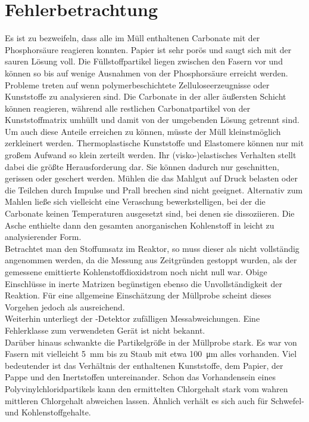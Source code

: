 \chapter{Fehlerbetrachtung}
\label{sec:fehler}

Es ist zu bezweifeln, dass alle im Müll enthaltenen Carbonate mit der Phosphorsäure reagieren konnten. Papier ist sehr porös und saugt sich mit der sauren Lösung voll. Die Füllstoffpartikel liegen zwischen den Fasern vor und können so bis auf wenige Ausnahmen von der Phosphorsäure erreicht werden. Probleme treten auf wenn polymerbeschichtete Zelluloseerzeugnisse oder Kunststoffe zu analysieren sind. Die Carbonate in der aller äußersten Schicht können reagieren, während alle restlichen Carbonatpartikel von der Kunststoffmatrix umhüllt und damit von der umgebenden Lösung getrennt sind. Um auch diese Anteile erreichen zu können, müsste der Müll kleinstmöglich zerkleinert werden. Thermoplastische Kunststoffe und Elastomere können nur mit großem Aufwand so klein zerteilt werden. Ihr (visko-)elastisches Verhalten stellt dabei die größte Herausforderung dar. Sie können dadurch nur geschnitten, gerissen oder geschert werden. Mühlen die das Mahlgut auf Druck belasten oder die Teilchen durch Impulse und Prall brechen sind nicht geeignet.
Alternativ zum Mahlen ließe sich vielleicht eine Veraschung bewerkstelligen, bei der die Carbonate keinen Temperaturen ausgesetzt sind, bei denen sie dissoziieren. Die Asche enthielte dann den gesamten anorganischen Kohlenstoff in leicht zu analysierender Form.\\
Betrachtet man den Stoffumsatz im Reaktor, so muss dieser als nicht vollständig angenommen werden, da die Messung aus Zeitgründen gestoppt wurden, als der gemessene emittierte Kohlenstoffdioxidstrom noch nicht null war. Obige Einschlüsse in inerte Matrizen begünstigen ebenso die Unvollständigkeit der Reaktion. \linebreak Für eine allgemeine Einschätzung der Müllprobe scheint dieses Vorgehen jedoch als ausreichend.\\
Weiterhin unterliegt der -Detektor zufälligen Messabweichungen. Eine Fehlerklasse zum verwendeten Gerät ist nicht bekannt.\\
Darüber hinaus schwankte die Partikelgröße in der Müllprobe stark. Es war von Fasern mit vielleicht \SI{5}{\milli\meter} bis zu Staub mit etwa \SI{100}{\micro\meter} alles vorhanden. Viel bedeutender ist das Verhältnis der enthaltenen Kunststoffe, dem Papier, der Pappe und den Inertstoffen untereinander. Schon das Vorhandensein eines Polyvinylchloridpartikels kann den ermittelten Chlorgehalt stark vom wahren mittleren Chlorgehalt abweichen lassen. Ähnlich verhält es sich auch für Schwefel- und Kohlenstoffgehalte.\\
